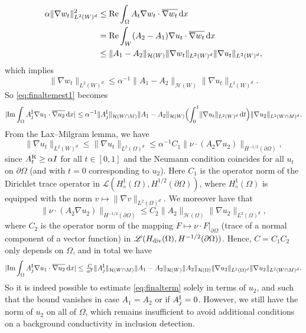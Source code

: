 \documentclass[reqno]{amsart}
\numberwithin{equation}{section}
\numberwithin{figure}{section}
\numberwithin{table}{section}
\theoremstyle{plain}
\theoremstyle{definition}
\theoremstyle{remark}
\newcommand{\norm}[1]{\lVert#1\rVert}
\newcommand{\abs}[1]{\lvert#1\rvert}
\newcommand{\redel}{\mathop{\textup{Re}}}
\newcommand{\imdel}{\mathop{\textup{Im}}}
\newcommand{\di}{\mathrm{d}}   %
\newcommand{\upR}{^{\textup{R}}}
\newcommand{\upI}{^{\textup{I}}}
\newcommand{\AR}{A\upR}
\newcommand{\AI}{A\upI}
\begin{document}
	\begin{align*}
		\alpha \norm{\nabla w_t}_{L^2(W)^d}^2 &\leq \redel \int_\Omega A_t\nabla w_t\cdot\overline{\nabla w_t}\,\di x\\
		&= \redel \int_W (A_2-A_1)\nabla u_t\cdot\overline{\nabla w_t}\,\di x \\
		&\leq \norm{A_1-A_2}_{\mathcal{H}(W)}\norm{\nabla w_t}_{L^2(W)^d}\norm{\nabla u_t}_{L^2(W)^d},
	\end{align*}
	which implies
	\begin{equation*}
		\norm{\nabla w_t}_{L^2(W)^d} \leq \alpha^{-1}\norm{A_1-A_2}_{\mathcal{H}(W)}\norm{\nabla u_t}_{L^2(W)^d}.
	\end{equation*}
	So \eqref{eq:finaltemest1} becomes
	\begin{equation*}
		\abs{\imdel \int_\Omega \AI_j\nabla u_1\cdot\overline{\nabla u_2}\,\di x} \leq \alpha^{-1}\norm{\AI_j}_{\mathcal{H}(W\cap M)}\norm{A_1-A_2}_{\mathcal{H}(W)}\Bigl(\int_0^1\norm{\nabla u_t}_{L^2(W)^d}\,\di t\Bigr)\norm{\nabla u_2}_{L^2(W\cap M)^d}.
	\end{equation*}
	From the Lax--Milgram lemma, we have
	\begin{equation*}
		\norm{\nabla u_t}_{L^2(W)^d} \leq \norm{\nabla u_t}_{L^2(\Omega)^d} \leq \alpha^{-1}C_1\norm{\nu\cdot (A_2\nabla u_2)}_{H^{-1/2}(\partial\Omega)},
	\end{equation*}
	since $\AR_t \geq \alpha I$ for all $t\in[0,1]$ and the Neumann condition coincides for all $u_t$ on $\partial\Omega$ (and with $t=0$ corresponding to $u_2$). Here $C_1$ is the operator norm of the Dirichlet trace operator in $\mathscr{L}(H^1_\diamond(\Omega),H^{1/2}(\partial\Omega))$, where $H^1_\diamond(\Omega)$ is equipped with the norm $v\mapsto\norm{\nabla v}_{L^2(\Omega)^d}$. We moreover have that
	\begin{equation*}
		\norm{\nu\cdot (A_2\nabla u_2)}_{H^{-1/2}(\partial\Omega)} \leq C_2\norm{A_2}_{\mathcal{H}(\Omega)}\norm{\nabla u_2}_{L^2(\Omega)^d},
	\end{equation*}
	where $C_2$ is the operator norm of the mapping $F\mapsto \nu\cdot F|_{\partial\Omega}$ (trace of a normal component of a vector function) in $\mathscr{L}(H_{\textup{div}}(\Omega),H^{-1/2}(\partial\Omega))$. Hence, $C = C_1C_2$ only depends on $\Omega$, and in total we have
	\begin{equation*}
		\abs{\imdel \int_\Omega \AI_j\nabla u_1\cdot\overline{\nabla u_2}\,\di x} \leq \tfrac{C}{\alpha^2}\norm{\AI_j}_{\mathcal{H}(W\cap M)}\norm{A_1-A_2}_{\mathcal{H}(W)}\norm{A_2}_{\mathcal{H}(\Omega)}\norm{\nabla u_2}_{L^2(\Omega)^d}\norm{\nabla u_2}_{L^2(W\cap M)^d}.
	\end{equation*}
	So it is indeed possible to estimate \eqref{eq:finalterm} solely in terms of $u_2$, and such that the bound vanishes in case $A_1 = A_2$ or if $\AI_j = 0$. However, we still have the norm of $u_2$ on all of $\Omega$, which remains insufficient to avoid additional conditions on a background conductivity in inclusion detection. 
	
\end{document}
